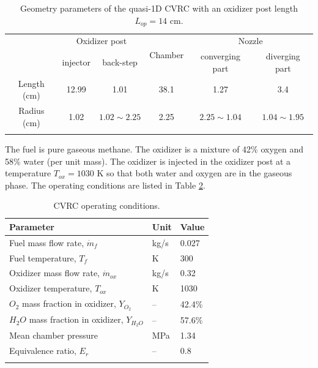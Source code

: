 \begin{table} [h]
	\centering
	\caption{Geometry parameters of the quasi-1D CVRC with an oxidizer post length $L_{op}=14$ cm.}
	\centering
	\begin{tabular}{c c c c c c }
		\toprule
		\centering
		\multirow{2}{*}{Section} &
		\multicolumn{2}{c}{Oxidizer post} &
		\multirow{2}{*}{Chamber} &
		\multicolumn{2}{c}{Nozzle} \\
		\cmidrule(lr){2-3} \cmidrule(lr){5-6}
		& injector & back-step & & converging part & diverging part\\
		\midrule
		Length (cm) & 12.99 & 1.01 & 38.1 & 1.27 & 3.4 \\
		Radius (cm) & 1.02  & $1.02 \sim 2.25$ & 2.25 & $2.25 \sim 1.04$ & $1.04 \sim 1.95$ \\
		\bottomrule
		\label{tab:geometry_parameters}
	\end{tabular} 
\end{table}

The fuel is pure gaseous methane. The oxidizer is a mixture of 42\% oxygen and 58\% water (per unit mass). The oxidizer is injected in the oxidizer post at a temperature $T_{ox}=1030$ K so that both water and oxygen are in the gaseous phase. The operating conditions are listed in Table \ref{tab:operating-conditions}.

\begin{table} [h]
	\centering
	\caption{CVRC operating conditions.}
	\centering
	\begin{tabular}{l l l}
		\toprule
		\centering
		Parameter & Unit & Value \\
		\midrule
		Fuel mass flow rate, $\dot{m}_{f}$ & kg/s & 0.027   \\
		Fuel temperature, $T_{f}$ & K & 300   \\
		Oxidizer mass flow rate, $\dot{m}_{ox}$ & kg/s & 0.32   \\
		Oxidizer temperature, $T_{ox}$ & K & 1030   \\
		$O_2$ mass fraction in oxidizer, $Y_{O_2}$ & -- & 42.4\%   \\
		$H_2O$ mass fraction in oxidizer, $Y_{H_2O}$ & -- & 57.6\%   \\
		Mean chamber pressure & MPa & 1.34 \\
		Equivalence ratio, $E_r$ & -- & 0.8 \\
		\bottomrule
		\label{tab:operating-conditions}
	\end{tabular} 
\end{table}

